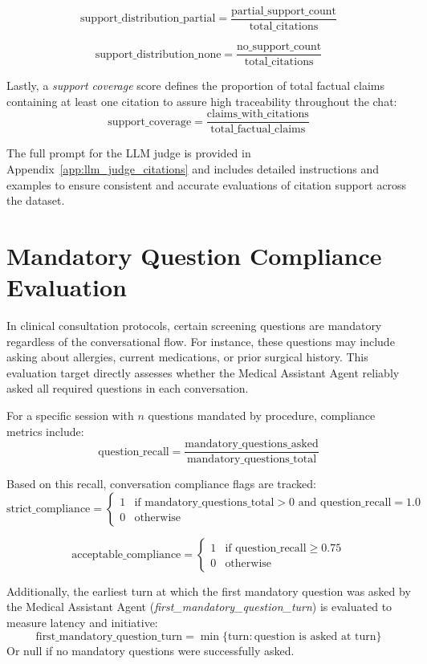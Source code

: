 \[
\text{support\_distribution\_partial} = \frac{\text{partial\_support\_count}}{\text{total\_citations}}
\]

\[
\text{support\_distribution\_none} = \frac{\text{no\_support\_count}}{\text{total\_citations}}
\]

Lastly, a \textit{support coverage} score defines the proportion of total factual claims containing at least one citation to assure high traceability throughout the chat:
\[
\text{support\_coverage} = \frac{\text{claims\_with\_citations}}{\text{total\_factual\_claims}}
\]

The full prompt for the LLM judge is provided in Appendix~\ref{app:llm_judge_citations} and includes detailed instructions and examples to ensure consistent and accurate evaluations of citation support across the dataset.

\section{Mandatory Question Compliance Evaluation}

In clinical consultation protocols, certain screening questions are mandatory regardless of the conversational flow. 
For instance, these questions may include asking about allergies, current medications, or prior surgical history. 
This evaluation target directly assesses whether the Medical Assistant Agent reliably asked all required questions in each conversation.

For a specific session with $n$ questions mandated by procedure, compliance metrics include:
\[
\text{question\_recall} = \frac{\text{mandatory\_questions\_asked}}{\text{mandatory\_questions\_total}}
\]

Based on this recall, conversation compliance flags are tracked:
\[
\text{strict\_compliance} = \begin{cases}
1 & \text{if } \text{mandatory\_questions\_total} > 0 \text{ and } \text{question\_recall} = 1.0 \\
0 & \text{otherwise}
\end{cases}
\]

\[
\text{acceptable\_compliance} = \begin{cases}
1 & \text{if } \text{question\_recall} \geq 0.75 \\
0 & \text{otherwise}
\end{cases}
\]

Additionally, the earliest turn at which the first mandatory question was asked by the Medical Assistant Agent (\textit{first\_mandatory\_question\_turn}) is evaluated to measure latency and initiative:
\[
\text{first\_mandatory\_question\_turn} = \min\{\text{turn} : \text{question is asked at turn}\}
\]
Or $\text{null}$ if no mandatory questions were successfully asked.

